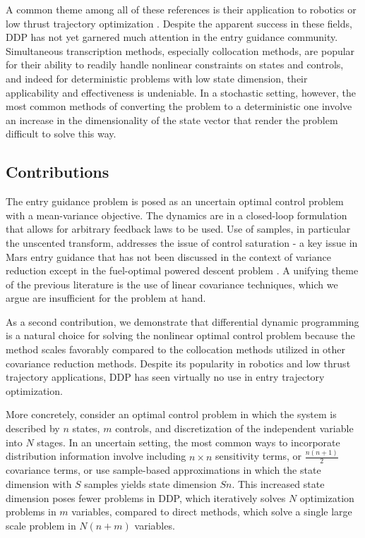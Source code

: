\documentclass[journal ]{new-aiaa}
\begin{document}
A common theme among all of these references is their application to robotics \cite{iLQG, DDP_Stochastic} or low thrust trajectory optimization \cite{HDDP1,HDDP2,ozaki_UT,ozaki2020tube}. Despite the apparent success in these fields, DDP has not yet garnered much attention in the entry guidance community. Simultaneous transcription methods, especially collocation methods, are popular for their ability to readily handle nonlinear constraints on states and controls, and indeed for deterministic problems with low state dimension, their applicability and effectiveness is undeniable. In a stochastic setting, however, the most common methods of converting the problem to a deterministic one involve an increase in the dimensionality of the state vector that render the problem difficult to solve this way.

\subsection*{Contributions}
The entry guidance problem is posed as an uncertain optimal control problem with a mean-variance objective. The dynamics are in a closed-loop formulation that allows for arbitrary feedback laws to be used. Use of samples, in particular the unscented transform, addresses the issue of control saturation - a key issue in Mars entry guidance that has not been discussed in the context of variance reduction except in the fuel-optimal powered descent problem \cite{DesensitizeFuelOptimal}. A unifying theme of the previous literature is the use of linear covariance techniques, which we argue are insufficient for the problem at hand. 

As a second contribution, we demonstrate that differential dynamic programming is a natural choice for solving the nonlinear optimal control problem because the method scales favorably compared to the collocation methods utilized in  other covariance reduction methods. Despite its popularity in robotics and low thrust trajectory applications, DDP has seen virtually no use in entry trajectory optimization. 

More concretely, consider an optimal control problem in which the system is described by $n$ states, $m$ controls, and discretization of the independent variable into $N$ stages. In an uncertain setting, the most common ways to incorporate distribution information involve including $n\times n$ sensitivity terms, or $\frac{n(n+1)}{2}$ covariance terms, or use sample-based approximations in which the state dimension with $S$ samples yields state dimension $Sn$. This increased state dimension poses fewer problems in DDP, which iteratively solves $N$ optimization problems in $m$ variables, compared to direct methods, which solve a single large scale problem in $N(n+m)$ variables.
\end{document}
